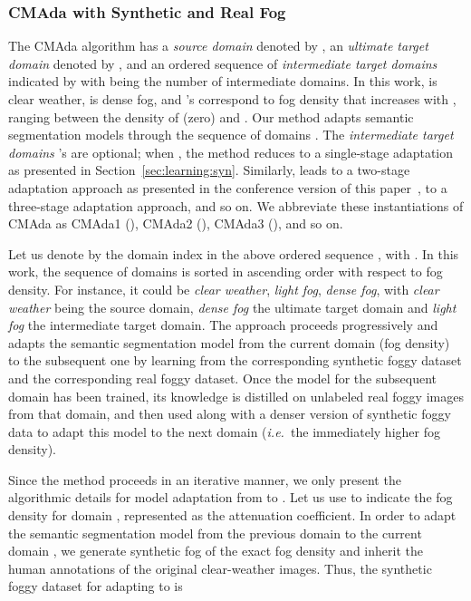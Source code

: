 \documentclass[twocolumn]{svjour3}          \smartqed  \usepackage{graphicx}
\newcommand{\ie}{\mbox{\emph{i.e.\ }}}
\begin{document}
\subsubsection{CMAda with Synthetic and Real Fog}
\label{sec:CMAda}

The CMAda algorithm has a \emph{source domain} denoted by , an \emph{ultimate target domain} denoted by , and an ordered sequence of \emph{intermediate target domains} indicated by  with  being the number of intermediate domains. In this work,  is clear weather,  is dense fog, and 's correspond to fog density that increases with , ranging between the density of  (zero) and . Our method adapts semantic segmentation models through the sequence of domains .
The \emph{intermediate target domains} 's are optional; when , the method reduces to a single-stage adaptation as presented in Section~\ref{sec:learning:syn}. Similarly,  leads to a two-stage adaptation approach as presented in the conference version of this paper~\cite{dense:SFSU:eccv18},  to a three-stage adaptation approach, and so on. We abbreviate these instantiations of CMAda as CMAda1 (), CMAda2 (), CMAda3 (), and so on.  

Let us denote by  the domain index in the above ordered sequence , with . In this work, the sequence of domains is sorted in ascending order with respect to fog density. For instance, it could be \emph{clear weather}, \emph{light fog}, \emph{dense fog}, with \emph{clear weather} being the source domain, \emph{dense fog} the ultimate target domain and \emph{light fog} the intermediate target domain. The approach proceeds progressively and adapts the semantic segmentation model from the current domain (fog density) to the subsequent one by learning from the corresponding synthetic foggy dataset and the corresponding real foggy dataset. Once the model for the subsequent domain has been trained, its knowledge is distilled on unlabeled real foggy images from that domain, and then used along with a denser version of synthetic foggy data to adapt this model to the next domain (\ie{}the immediately higher fog density).

Since the method proceeds in an iterative manner, we only present the algorithmic details for model adaptation from  to . Let us use  to indicate the fog density for domain , represented as the attenuation coefficient. In order to adapt the semantic segmentation model  from the previous domain  to the current domain , we generate synthetic fog of the exact fog density  and inherit the human annotations of the original clear-weather images. Thus, the synthetic foggy dataset for adapting to  is
\end{document}
